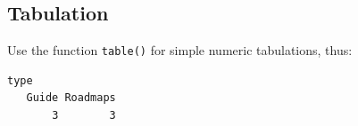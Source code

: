 \subsection*{Tabulation}
Use the function \texttt{table()} for simple numeric tabulations,
thus:
\begin{knitrout}
\color{fgcolor}\begin{kframe}
\begin{alltt}
 \hlkwb{<-} \hlstd{(}\hlstd{,}\hlstd{,}\hlstd{,}\hlstd{,}
          \hlstd{,}\hlstd{)}
\end{alltt}
\begin{verbatim}
type
   Guide Roadmaps 
       3        3 
\end{verbatim}
\end{kframe}
\end{knitrout}

